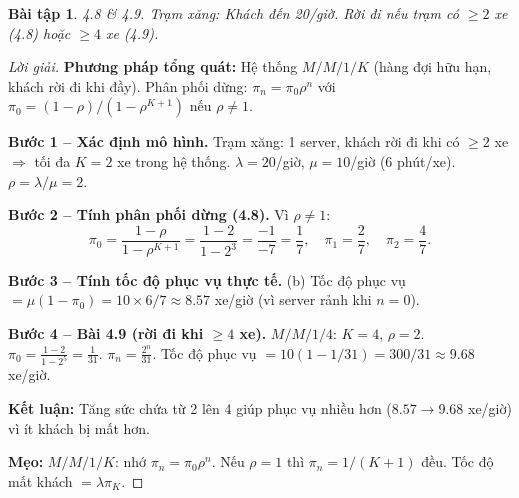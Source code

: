 \documentclass[8pt,a4paper]{article}
\newtheorem{exercise}{Bài tập}
\newenvironment{solution}{\begin{proof}[Lời giải]}{\end{proof}}
\begin{document}
\begin{exercise}
4.8 \& 4.9. Trạm xăng: Khách đến 20/giờ. Rời đi nếu trạm có $\ge 2$ xe (4.8) hoặc $\ge 4$ xe (4.9).
\end{exercise}
\begin{solution}
\textbf{Phương pháp tổng quát:} Hệ thống $M/M/1/K$ (hàng đợi hữu hạn, khách rời đi khi đầy). Phân phối dừng: $\pi_n = \pi_0 \rho^n$ với $\pi_0 = (1-\rho)/(1-\rho^{K+1})$ nếu $\rho \neq 1$.

\textbf{Bước 1 -- Xác định mô hình.} Trạm xăng: 1 server, khách rời đi khi có $\ge 2$ xe $\Rightarrow$ tối đa $K=2$ xe trong hệ thống. $\lambda = 20$/giờ, $\mu = 10$/giờ (6 phút/xe). $\rho = \lambda/\mu = 2$.

\textbf{Bước 2 -- Tính phân phối dừng (4.8).} Vì $\rho \neq 1$:
\[
\pi_0 = \frac{1-\rho}{1-\rho^{K+1}} = \frac{1-2}{1-2^3} = \frac{-1}{-7} = \frac{1}{7}, \quad \pi_1 = \frac{2}{7}, \quad \pi_2 = \frac{4}{7}.
\]

\textbf{Bước 3 -- Tính tốc độ phục vụ thực tế.}
(b) Tốc độ phục vụ $= \mu(1-\pi_0) = 10 \times 6/7 \approx \boxed{8.57}$ xe/giờ (vì server rảnh khi $n=0$).

\textbf{Bước 4 -- Bài 4.9 (rời đi khi $\ge 4$ xe).} $M/M/1/4$: $K=4$, $\rho=2$.
$\pi_0 = \frac{1-2}{1-2^5} = \frac{1}{31}$. $\pi_n = \frac{2^n}{31}$. Tốc độ phục vụ $= 10(1-1/31) = 300/31 \approx 9.68$ xe/giờ.

\textbf{Kết luận:} Tăng sức chứa từ 2 lên 4 giúp phục vụ nhiều hơn ($8.57 \to 9.68$ xe/giờ) vì ít khách bị mất hơn.

\textbf{Mẹo:} $M/M/1/K$: nhớ $\pi_n = \pi_0 \rho^n$. Nếu $\rho = 1$ thì $\pi_n = 1/(K+1)$ đều. Tốc độ mất khách $= \lambda \pi_K$.
\end{solution}
\end{document}

